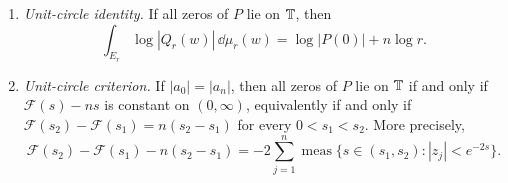 \begin{theorem}
\begin{enumerate}[label=\textup{(\alph*)}]
\[\]
Thus the slope jump at the breakpoint \(s_0=-\frac12\log|z_j|\) is
\[
\mathcal F'_+(s_0)-\mathcal F'_-(s_0)
=2\#\{j:\ |z_j|=e^{-2s_0}\},
\]
with roots counted with multiplicity.  Equivalently, as distributions on
\((0,\infty)\),
\[
D_s^2\mathcal F
=2\sum_{\{j:\ |z_j|<1\}}\delta_{-\frac12\log|z_j|}.
\]
\item \emph{Unit-circle identity.}  If all zeros of \(P\) lie on \(\mathbb{T}\), then
\[
\int_{E_r}\log|Q_r(w)|\,\dd\mu_r(w)=\log|P(0)|+n\log r.
\]
\item \emph{Unit-circle criterion.}  If \(|a_0|=|a_n|\), then all zeros of \(P\) lie on \(\mathbb{T}\) if and only if \(\mathcal F(s)-ns\) is constant on \((0,\infty)\), equivalently if and only if \(\mathcal F(s_2)-\mathcal F(s_1)=n(s_2-s_1)\) for every \(0<s_1<s_2\).  More precisely,
\[
\mathcal F(s_2)-\mathcal F(s_1)-n(s_2-s_1)
=-2\sum_{j=1}^{n}\operatorname{meas}\{s\in(s_1,s_2): |z_j|<e^{-2s}\}.
\]
\end{enumerate}
\end{theorem}
